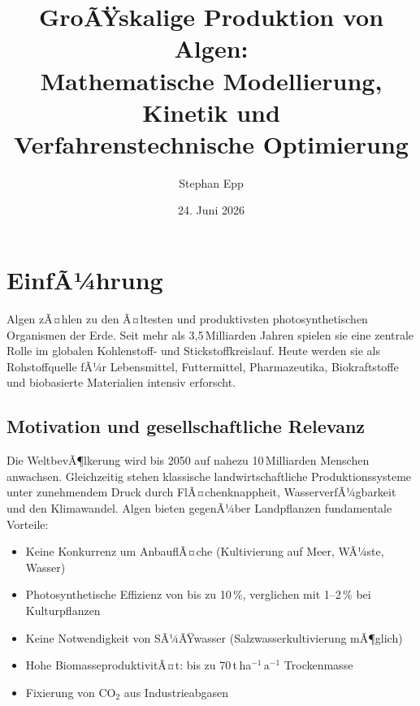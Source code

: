 ﻿\documentclass[a4paper,12pt]{article}
\title{GroÃŸskalige Produktion von Algen:\\
Mathematische Modellierung, Kinetik und\\
Verfahrenstechnische Optimierung}
\author{Stephan Epp}
\date{24. Juni 2026}
\theoremstyle{definition}
\begin{document}
\maketitle

\tableofcontents
\newpage

\section{EinfÃ¼hrung}

Algen zÃ¤hlen zu den Ã¤ltesten und produktivsten photosynthetischen Organismen der Erde.
Seit mehr als 3,5\,Milliarden Jahren spielen sie eine zentrale Rolle im globalen Kohlenstoff-
und Stickstoffkreislauf. Heute werden sie als Rohstoffquelle fÃ¼r Lebensmittel, Futtermittel,
Pharmazeutika, Biokraftstoffe und biobasierte Materialien intensiv erforscht.

\subsection{Motivation und gesellschaftliche Relevanz}

Die WeltbevÃ¶lkerung wird bis 2050 auf nahezu 10\,Milliarden Menschen anwachsen.
Gleichzeitig stehen klassische landwirtschaftliche Produktionssysteme unter zunehmendem
Druck durch FlÃ¤chenknappheit, WasserverfÃ¼gbarkeit und den Klimawandel. Algen bieten
gegenÃ¼ber Landpflanzen fundamentale Vorteile:

\begin{itemize}
	\item Keine Konkurrenz um AnbauflÃ¤che (Kultivierung auf Meer, WÃ¼ste, Wasser)
	\item Photosynthetische Effizienz von bis zu 10\,\%, verglichen mit 1--2\,\% bei
	      Kulturpflanzen
	\item Keine Notwendigkeit von SÃ¼ÃŸwasser (Salzwasserkultivierung mÃ¶glich)
	\item Hohe BiomasseproduktivitÃ¤t: bis zu 70\,t\,ha$^{-1}$\,a$^{-1}$ Trockenmasse
	\item Fixierung von \(\mathrm{CO}_2\) aus Industrieabgasen
\end{itemize}
\end{document}
